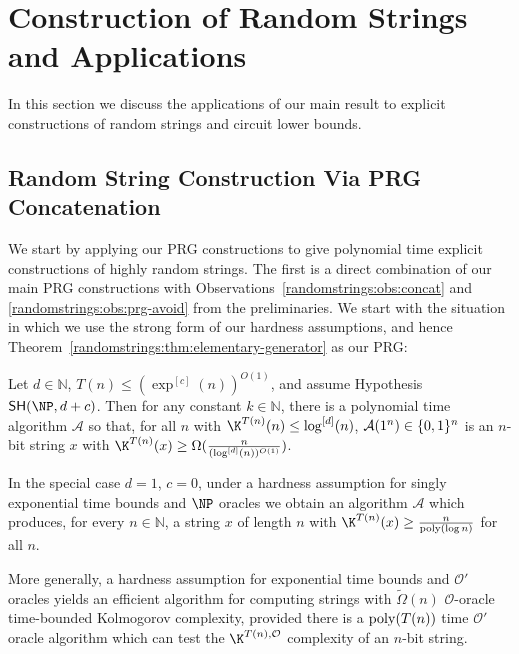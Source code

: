 \section{Construction of Random Strings and Applications}
In this section we discuss the applications of our main result to explicit constructions of random strings and circuit lower bounds.
\subsection{Random String Construction Via PRG Concatenation}
We start by applying our PRG constructions to give polynomial time explicit constructions of highly random strings. The first is a direct combination of our main PRG constructions with Observations~\ref{randomstrings:obs:concat} and \ref{randomstrings:obs:prg-avoid} from the preliminaries. We start with the situation in which we use the strong form of our hardness assumptions, and hence Theorem~\ref{randomstrings:thm:elementary-generator} as our PRG:
\begin{theorem}\label{randomstrings:thm:elementary-random-strings-ae}
Let $d \in \mathbb{N}$, $T(n) \leq (\exp^{[c]}(n))^{O(1)}$, and assume Hypothesis $\SH(\NP,d+c)$. Then for any constant $k\in \mathbb{N}$, there is a polynomial time algorithm $\mathcal{A}$ so that, for all $n$ with $\K^{T(n)}(n) \leq \log^{[d]}(n)$, $\mathcal{A}(1^n) \in \{0,1\}^{n}$ is an $n$-bit string $x$ with $\K^{T(n)}(x) \geq \Omega(\frac{n}{(\log^{[d]}(n))^{O(1)}})$. 

In the special case $d = 1$, $c = 0$, under a hardness assumption for singly exponential time bounds and $\NP$ oracles we obtain an algorithm $\mathcal{A}$ which produces, for every $n \in \mathbb{N}$, a string $x$ of length $n$ with $\K^{T(n)}(x) \geq \frac{n}{\poly(\log n)}$ for all $n$.

More generally, a hardness assumption for exponential time bounds and $\mathcal{O'}$ oracles yields an efficient algorithm for computing strings with $\tilde{\Omega}(n)$ $\mathcal{O}$-oracle time-bounded Kolmogorov complexity, provided there is a $\mathrm{poly}(T(n))$ time $\mathcal{O'}$ oracle algorithm which can test the $\K^{T(n), \mathcal{O}}$ complexity of an $n$-bit string.
\end{theorem}

